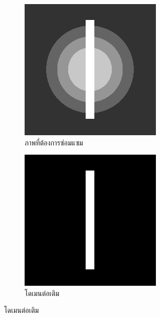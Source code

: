 \begin{figure}[H]
	\centering
	\begin{subfigure}{0.3\linewidth}
		\centering
		\includegraphics[width=0.8\linewidth]{image/grayscale_inpaint/toinpaint.png}
        \caption{ภาพที่ต้องการซ่อมแซม}
        \label{figure:inpaint-explain:to-inpaint}
	\end{subfigure}
	\begin{subfigure}{0.3\linewidth}
		\centering
		\includegraphics[width=0.8\linewidth]{image/grayscale_inpaint/inpaintdomain.png}
        \caption{โดเมนต่อเติม}
        \label{figure:inpaint-explain:inpaint-domain}

\end{subfigure}
\end{figure}
